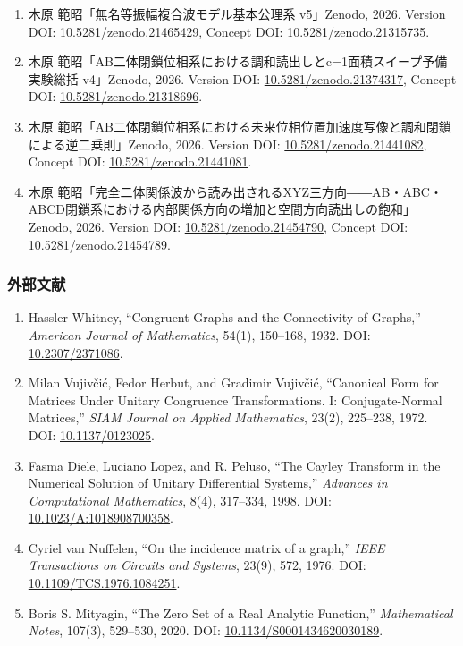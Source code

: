 \documentclass[
  a4paper,
]{ltjsarticle}
\providecommand{\tightlist}{%
  \setlength{\itemsep}{0pt}\setlength{\parskip}{0pt}}
\begin{document}
\begin{enumerate}
\def\labelenumi{\arabic{enumi}.}
\tightlist
\item
  木原 範昭「無名等振幅複合波モデル基本公理系 v5」Zenodo, 2026. Version
  DOI:
  \href{https://doi.org/10.5281/zenodo.21465429}{10.5281/zenodo.21465429},
  Concept DOI:
  \href{https://doi.org/10.5281/zenodo.21315735}{10.5281/zenodo.21315735}.
\item
  木原
  範昭「AB二体閉鎖位相系における調和読出しとc=1面積スイープ予備実験総括
  v4」Zenodo, 2026. Version DOI:
  \href{https://doi.org/10.5281/zenodo.21374317}{10.5281/zenodo.21374317},
  Concept DOI:
  \href{https://doi.org/10.5281/zenodo.21318696}{10.5281/zenodo.21318696}.
\item
  木原
  範昭「AB二体閉鎖位相系における未来位相位置加速度写像と調和閉鎖による逆二乗則」Zenodo,
  2026. Version DOI:
  \href{https://doi.org/10.5281/zenodo.21441082}{10.5281/zenodo.21441082},
  Concept DOI:
  \href{https://doi.org/10.5281/zenodo.21441081}{10.5281/zenodo.21441081}.
\item
  木原
  範昭「完全二体関係波から読み出されるXYZ三方向――AB・ABC・ABCD閉鎖系における内部関係方向の増加と空間方向読出しの飽和」Zenodo,
  2026. Version DOI:
  \href{https://doi.org/10.5281/zenodo.21454790}{10.5281/zenodo.21454790},
  Concept DOI:
  \href{https://doi.org/10.5281/zenodo.21454789}{10.5281/zenodo.21454789}.
\end{enumerate}

\subsubsection{外部文献}\label{ux5916ux90e8ux6587ux732e}

\begin{enumerate}
\def\labelenumi{\arabic{enumi}.}
\setcounter{enumi}{4}
\tightlist
\item
  Hassler Whitney, ``Congruent Graphs and the Connectivity of Graphs,''
  \emph{American Journal of Mathematics}, 54(1), 150--168, 1932. DOI:
  \href{https://doi.org/10.2307/2371086}{10.2307/2371086}.
\item
  Milan Vujivčić, Fedor Herbut, and Gradimir Vujivčić, ``Canonical Form
  for Matrices Under Unitary Congruence Transformations. I:
  Conjugate-Normal Matrices,'' \emph{SIAM Journal on Applied
  Mathematics}, 23(2), 225--238, 1972. DOI:
  \href{https://doi.org/10.1137/0123025}{10.1137/0123025}.
\item
  Fasma Diele, Luciano Lopez, and R. Peluso, ``The Cayley Transform in
  the Numerical Solution of Unitary Differential Systems,''
  \emph{Advances in Computational Mathematics}, 8(4), 317--334, 1998.
  DOI:
  \href{https://doi.org/10.1023/A:1018908700358}{10.1023/A:1018908700358}.
\item
  Cyriel van Nuffelen, ``On the incidence matrix of a graph,''
  \emph{IEEE Transactions on Circuits and Systems}, 23(9), 572, 1976.
  DOI:
  \href{https://doi.org/10.1109/TCS.1976.1084251}{10.1109/TCS.1976.1084251}.
\item
  Boris S. Mityagin, ``The Zero Set of a Real Analytic Function,''
  \emph{Mathematical Notes}, 107(3), 529--530, 2020. DOI:
  \href{https://doi.org/10.1134/S0001434620030189}{10.1134/S0001434620030189}.
\end{enumerate}
\end{document}
